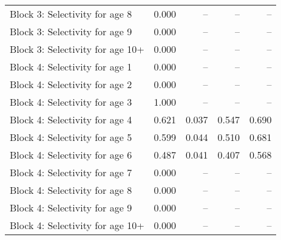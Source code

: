 \documentclass[
]{article}
\begin{document}
\begin{landscape}
\begin{longtable}[t]{lrrrr}
Block 3: Selectivity for age 8 & 0.000 & -- & -- & --\\
Block 3: Selectivity for age 9 & 0.000 & -- & -- & --\\
Block 3: Selectivity for age 10+ & 0.000 & -- & -- & --\\
Block 4: Selectivity for age 1 & 0.000 & -- & -- & --\\
\addlinespace
Block 4: Selectivity for age 2 & 0.000 & -- & -- & --\\
Block 4: Selectivity for age 3 & 1.000 & -- & -- & --\\
Block 4: Selectivity for age 4 & 0.621 & 0.037 & 0.547 & 0.690\\
Block 4: Selectivity for age 5 & 0.599 & 0.044 & 0.510 & 0.681\\
Block 4: Selectivity for age 6 & 0.487 & 0.041 & 0.407 & 0.568\\
\addlinespace
Block 4: Selectivity for age 7 & 0.000 & -- & -- & --\\
Block 4: Selectivity for age 8 & 0.000 & -- & -- & --\\
Block 4: Selectivity for age 9 & 0.000 & -- & -- & --\\
Block 4: Selectivity for age 10+ & 0.000 & -- & -- & --\\*
\end{longtable}
\end{landscape}
\end{document}
